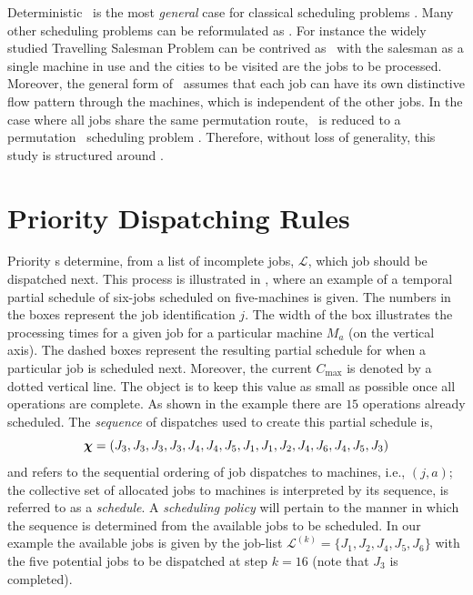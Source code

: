 \documentclass[smallextended]{svjour3}
\begin{document}
Deterministic \JSP\ is the most \emph{general} case for classical scheduling 
problems \cite{Jain99}. 
Many other scheduling problems can be reformulated as \JSP. 
For instance the widely studied Travelling Salesman Problem can be 
contrived as \jsp\ with the salesman as a single machine in use and the cities 
to be visited are the jobs to be processed.
Moreover, the general form of \JSP\ assumes that each job can have its own 
distinctive flow pattern through the machines, which is independent of the 
other jobs. 
In the case where all jobs share the same permutation route, \jsp\ is reduced 
to a permutation \fsp\ scheduling problem \cite{Guinet1998,Tay08}. 
Therefore, without loss of generality, this study is structured around 
\JSP. 



\section{Priority Dispatching Rules} \label{sec:constructionjssp}


Priority \dr s determine, from a list of incomplete jobs, 
$\mathcal{L}$, which job should be dispatched next. This process is illustrated 
in , where an example of 
a temporal partial schedule of six-jobs scheduled on five-machines is given. 
The numbers in the boxes represent the job identification $j$. 
The width of the box illustrates the processing times for a given job for a 
particular machine $M_a$ (on the vertical axis). 
The dashed boxes represent the resulting partial schedule for when a particular 
job is scheduled next. 
Moreover, the current $C_{\max}$ is denoted by a dotted vertical line. 
The object is to keep this value as small as possible once all operations are 
complete. As shown in the example there are $15$ operations already scheduled. 
The \textit{sequence} of dispatches used to create this partial schedule is,
\begin{equation}
	\bm \chi=\left(J_3,J_3,J_3,J_3,J_4,J_4,J_5,J_1,J_1,J_2,J_4,J_6,J_4,J_5,J_3\right)
\end{equation}
and refers to the sequential ordering of job dispatches to machines, i.e., $(j,a)$; 
the collective set of allocated jobs to machines is interpreted by its 
sequence, is referred to as a \emph{schedule}.
A \emph{scheduling policy} will pertain to the manner in which 
the sequence is determined from the available jobs to be scheduled. 
In our example the available jobs is given by the job-list
$\mathcal{L}^{(k)}=\{J_1,J_2,J_4,J_5,J_6\}$ with the five potential jobs 
to be dispatched at step $k=16$ (note that $J_3$ is completed).
\end{document}
